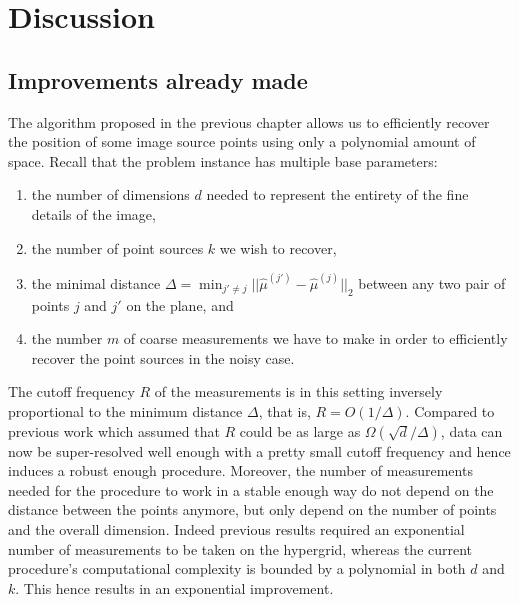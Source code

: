 \chapter{Discussion}
\section{Improvements already made}
The algorithm proposed in the previous chapter allows us to efficiently recover the position of some image source points using only a polynomial amount of space. Recall that the problem instance has multiple base parameters:
\begin{enumerate}
    \item the number of dimensions $d$ needed to represent the entirety of the fine details of the image,
    \item the number of point sources $k$ we wish to recover,
    \item the minimal distance $\Delta=\min_{j'\neq j}||\widehat{\mu}^{(j')}-\widehat{\mu}^{(j)}||_2$ between any two pair of points $j$ and $j'$ on the plane, and
    \item the number $m$ of coarse measurements we have to make in order to efficiently recover the point sources in the noisy case.
\end{enumerate}
The cutoff frequency $R$ of the measurements is in this setting inversely proportional to the minimum distance $\Delta$, that is, $R=O(1/\Delta)$. Compared to previous work which assumed that $R$ could be as large as $\Omega(\sqrt{d}/\Delta)$, data can now be super-resolved well enough with a pretty small cutoff frequency and hence induces a robust enough procedure. Moreover, the number of measurements needed for the procedure to work in a stable enough way do not depend on the distance between the points anymore, but only depend on the number of points and the overall dimension. Indeed previous results required an exponential number of measurements to be taken on the hypergrid, whereas the current procedure's computational complexity is bounded by a polynomial in both $d$ and $k$. This hence results in an exponential improvement.

